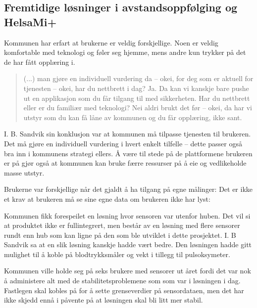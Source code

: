 \subsection{Fremtidige løsninger i avstandsoppfølging og HelsaMi+}
Kommunen har erfart at brukerne er veldig forskjellige. Noen er veldig komfortable med teknologi og føler seg hjemme, mens andre
kun trykker på det de har fått opplæring i.
\blockquote{
(...) man gjøre en individuell vurdering da -- okei, for deg som er aktuell for tjenesten -- okei, har du nettbrett i dag? Ja.
Da kan vi kanskje bare pushe ut en applikasjon som
du får tilgang til med sikkerheten. Har du nettbrett eller er du familiær med teknologi? Nei aldri brukt det før -- okei,
da har vi utstyr som du kan få låne av kommunen og du får opplæring, ikke sant.
}

I. B. Sandvik sin konklusjon var at kommunen må tilpasse tjenesten til brukeren. Det må gjøre en individuell vurdering i hvert enkelt tilfelle --
dette passer også bra inn i kommunens strategi ellers. Å være til stede på de plattformene brukeren er på gjør også at kommunen kan
bruke færre ressurser på å eie og vedlikeholde masse utstyr.

Brukerne var forskjellige når det gjaldt å ha tilgang på egne målinger: 
Det er ikke et krav at brukeren må se sine egne data om brukeren ikke har lyst: 

Kommunen fikk forespeilet en løsning hvor sensoren var utenfor huben. Det vil si at produktet ikke er fullintegrert, men består
av en løsning med flere sensorer rundt enn hub som kan ligne på den som ble utviklet i dette prosjektet. I. B Sandvik sa
at en slik løsning kanskje hadde vært bedre. Den løsningen hadde gitt mulighet til å koble på blodtrykksmåler og vekt i tillegg til
pulsoksymeter.

Kommunen ville holde seg på seks brukere med sensorer ut året fordi det var nok å administere alt med de stabilitetsproblemene som
som var i løsningen i dag.
 Fastlegen skal kobles på for å sette grenseverdier på sensordataen,
men det har ikke skjedd ennå i påvente på at løsningen skal bli litt mer stabil.


